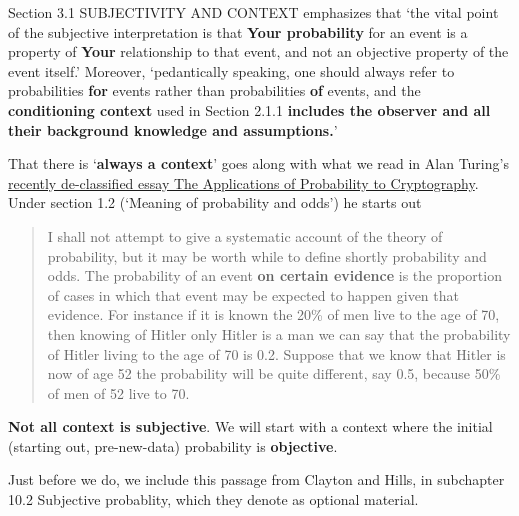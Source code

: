 \documentclass[]{book}
\begin{document}
Section 3.1 SUBJECTIVITY AND CONTEXT emphasizes that
`the vital point of the subjective interpretation is that \textbf{Your probability} for an event is a property of \textbf{Your} relationship to that event, and not an objective property of the event itself.' Moreover, `pedantically speaking, one should always refer to probabilities \textbf{for} events rather than probabilities \textbf{of} events, and the \textbf{conditioning context} used in Section 2.1.1 \textbf{includes the observer and all their background knowledge and assumptions.}'

That there is `\textbf{always a context}' goes along with what we read in Alan Turing's \href{http://www.medicine.mcgill.ca/epidemiology/hanley/bios601/CandH-ch0102/TuringProbability.pdf}{recently de-classified essay The Applications of Probability to Cryptography}. Under section 1.2 (`Meaning of probability and odds') he starts out

\begin{quote}
I shall not attempt to give a systematic account of the theory of probability, but it may be worth while to define shortly probability and odds. The probability of an event \textbf{on certain evidence} is the proportion of cases in which that event may be expected to happen given that evidence. For instance if it is known the 20\% of men live to the age of 70, then knowing of Hitler only Hitler is a man we can say that the probability of Hitler living to the age of 70 is 0.2. Suppose that we know that Hitler is now of age 52 the probability will be quite different, say 0.5, because 50\% of men of 52 live to 70.
\end{quote}

\textbf{Not all context is subjective}. We will start with a context where the initial (starting out, pre-new-data) probability is \textbf{objective}.

Just before we do, we include this passage from Clayton and Hills, in subchapter 10.2 Subjective probablity, which they denote as optional material.
\end{document}
